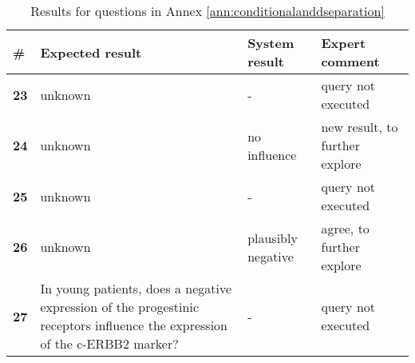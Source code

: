 \begin{table}[h]
	\centering
	\caption{Results for questions in Annex \ref{ann:conditionalanddseparation}}
	\begin{tabularx}{\textwidth}{lXXX}
		\toprule
		\textbf{\#} & Expected result & System result & Expert comment  \\
		\midrule	
		\textbf{23} & unknown &    -   & query not executed \\
		\addlinespace
		\textbf{24} & unknown & no influence & new result, to further explore \\
		\addlinespace
		\textbf{25} & unknown &   -    & query not executed \\
		\addlinespace
		\textbf{26} & unknown & plausibly negative & agree, to further explore \\
		\addlinespace[2ex]
		\textbf{27} & In young patients, does a negative expression of the progestinic receptors influence the expression of the c-ERBB2 marker? &    -   & query not executed \\
		\bottomrule
		\end{tabularx}
	\label{tab:resultsdseparationquestions}
\end{table}


